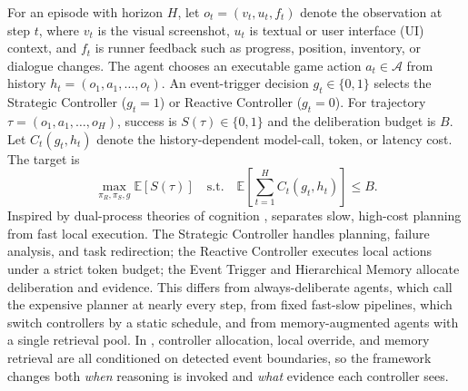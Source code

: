 For an episode with horizon $H$, let
$o_t=(v_t,u_t,f_t)$ denote the observation at step $t$, where $v_t$ is the
visual screenshot, $u_t$ is textual or user interface (UI) context, and $f_t$ is runner feedback
such as progress, position, inventory, or dialogue changes. The agent chooses an
executable game action $a_t\in\mathcal{A}$ from history
$h_t=(o_1,a_1,\ldots,o_t)$. An event-trigger decision $g_t\in\{0,1\}$ selects the
Strategic Controller ($g_t=1$) or Reactive Controller ($g_t=0$). For trajectory
$\tau=(o_1,a_1,\ldots,o_H)$, success is $S(\tau)\in\{0,1\}$ and the deliberation
budget is $B$. Let $C_t(g_t,h_t)$ denote the history-dependent model-call, token,
or latency cost. The target is
\begin{equation}
\label{eq:budgeted_control_objective}
\max_{\pi_R,\pi_S,g}\mathbb{E}[S(\tau)]
\quad
\mathrm{s.t.}\quad
\mathbb{E}\!\left[\sum_{t=1}^{H} C_t(g_t,h_t)\right]\le B .
\end{equation}
Inspired by dual-process theories of cognition \citep{kahneman2011thinking},
\method{} separates slow, high-cost planning from fast local execution. The
Strategic Controller handles planning, failure analysis, and task redirection;
the Reactive Controller executes local actions under a strict token budget; the
Event Trigger and Hierarchical Memory allocate deliberation and evidence.
This differs from always-deliberate agents, which call the expensive planner at
nearly every step, from fixed fast-slow pipelines, which switch controllers by a
static schedule, and from memory-augmented agents with a single retrieval pool.
In \method{}, controller allocation, local override, and memory retrieval are
all conditioned on detected event boundaries, so the framework changes both
\emph{when} reasoning is invoked and \emph{what} evidence each controller sees.


